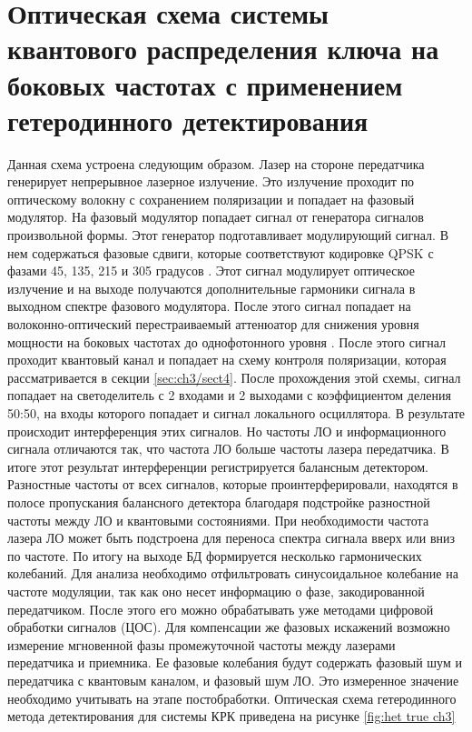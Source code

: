 \section{Оптическая схема системы квантового распределения ключа на боковых частотах с применением гетеродинного детектирования }\label{sec:ch3/sect5}
Данная схема устроена следующим образом. Лазер на стороне передатчика генерирует непрерывное лазерное излучение. Это излучение проходит по оптическому волокну с сохранением поляризации и попадает на фазовый модулятор. На фазовый модулятор попадает сигнал от генератора сигналов произвольной формы. Этот генератор подготавливает модулирующий сигнал. В нем содержаться фазовые сдвиги, которые соответствуют кодировке QPSK с фазами 45, 135, 215 и 305 градусов \cite{karinou2018}. Этот сигнал модулирует оптическое излучение и на выходе получаются дополнительные гармоники сигнала в выходном спектре фазового модулятора. После этого сигнал попадает на волоконно-оптический перестраиваемый аттенюатор для снижения уровня мощности на боковых частотах до однофотонного уровня \cite{oxborrow2005}.
После этого сигнал проходит квантовый канал и попадает на схему контроля поляризации, которая рассматривается в секции \ref{sec:ch3/sect4}. После прохождения этой схемы, сигнал попадает на светоделитель с 2 входами и 2 выходами с коэффициентом деления 50:50, на входы которого попадает и сигнал локального осциллятора. В результате происходит интерференция этих сигналов. Но частоты ЛО и информационного сигнала отличаются так, что частота ЛО больше частоты лазера передатчика. В итоге этот результат интерференции регистрируется балансным детектором. Разностные частоты от всех сигналов, которые проинтерферировали, находятся в полосе пропускания балансного детектора благодаря подстройке разностной частоты между ЛО и квантовыми состояниями. При необходимости частота лазера ЛО может быть подстроена для переноса спектра сигнала вверх или вниз по частоте. По итогу на выходе БД формируется несколько гармонических колебаний. Для анализа необходимо отфильтровать синусоидальное колебание на частоте модуляции, так как оно несет информацию о фазе, закодированной передатчиком. После этого его можно обрабатывать уже методами цифровой обработки сигналов (ЦОС). Для компенсации же фазовых искажений возможно измерение мгновенной фазы промежуточной частоты между лазерами передатчика и приемника. Ее фазовые колебания будут содержать фазовый шум и передатчика с квантовым каналом, и фазовый шум ЛО. Это измеренное значение необходимо учитывать на этапе постобработки. 
Оптическая схема гетеродинного метода детектирования для системы КРК приведена на рисунке \ref*{fig:het true ch3} 
